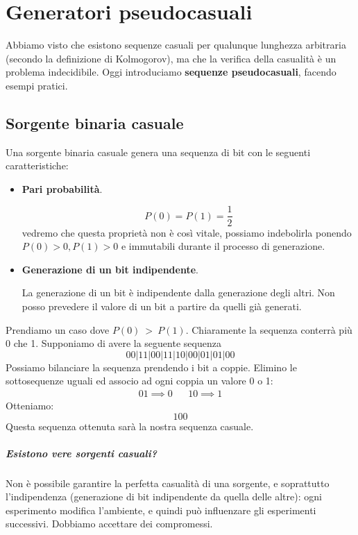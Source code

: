 \chapter{Generatori pseudocasuali}
Abbiamo visto che esistono sequenze casuali per qualunque lunghezza arbitraria (secondo la definizione di Kolmogorov), ma che la verifica della casualità è un problema indecidibile. Oggi introduciamo \textbf{sequenze pseudocasuali}, facendo esempi pratici.
\section{Sorgente binaria casuale}
Una sorgente binaria casuale genera una sequenza di bit con le seguenti caratteristiche:
\begin{itemize}
	\item \textbf{Pari probabilità}.
	
	
	\[P(0)=P(1)=\frac{1}{2}\]
	vedremo che questa proprietà non è così vitale, possiamo indebolirla ponendo $P(0)>0, P(1)>0$ e immutabili durante il processo di generazione.
	\item \textbf{Generazione di un bit indipendente}.
	
	
	La generazione di un bit è indipendente dalla generazione degli altri. 
	Non posso prevedere il valore di un bit a partire da quelli già generati.
\end{itemize}
Prendiamo un caso dove $P(0)\ >\ P(1)$. Chiaramente la sequenza conterrà più 0 che 1. Supponiamo di avere la seguente sequenza
$$ 00|11|00|11|10|00|01|01|00 $$
Possiamo bilanciare la sequenza prendendo i bit a coppie. Elimino le sottosequenze uguali ed associo ad ogni coppia un valore 0 o 1:
\begin{align*}
01 \implies 0 && 10 \implies 1
\end{align*}
Otteniamo:
$$ 100 $$
Questa sequenza ottenuta sarà la nostra sequenza casuale.

\paragraph{Esistono vere sorgenti casuali?} Non è possibile garantire la perfetta casualità di una sorgente, e soprattutto l’indipendenza (generazione di bit indipendente da quella delle altre): ogni esperimento modifica l’ambiente, e quindi può influenzare gli esperimenti successivi. Dobbiamo accettare dei compromessi.


